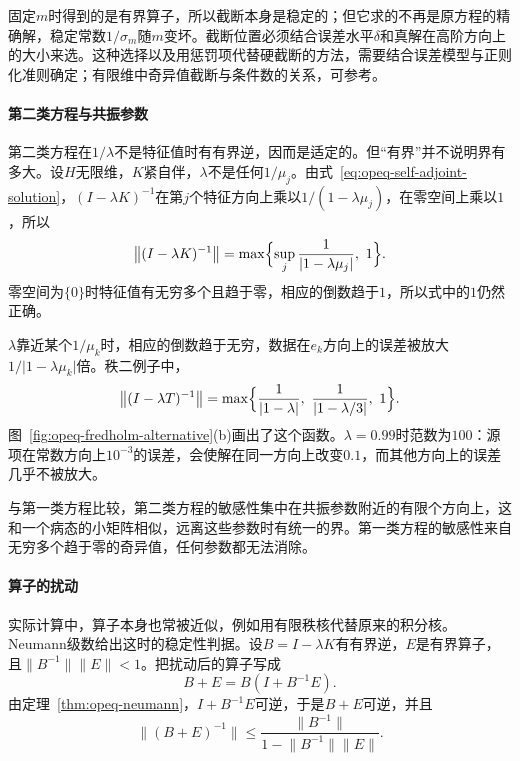 固定$m$时得到的是有界算子，所以截断本身是稳定的；但它求的不再是原方程的精确解，稳定常数$1/\sigma_m$随$m$变坏。截断位置必须结合误差水平$\delta$和真解在高阶方向上的大小来选。这种选择以及用惩罚项代替硬截断的方法，需要结合误差模型与正则化准则确定；有限维中奇异值截断与条件数的关系，可参考。

\paragraph{第二类方程与共振参数}
第二类方程在$1/\lambda$不是特征值时有有界逆，因而是适定的。但“有界”并不说明界有多大。设$H$无限维，$K$紧自伴，$\lambda$不是任何$1/\mu_j$。由式~\eqref{eq:opeq-self-adjoint-solution}，$(I-\lambda K)^{-1}$在第$j$个特征方向上乘以$1/(1-\lambda\mu_j)$，在零空间上乘以$1$，所以
\begin{equation}
  \bigl\lVert(I-\lambda K)^{-1}\bigr\rVert
  =\max\Bigl\{\sup_j\frac{1}{\lvert1-\lambda\mu_j\rvert},\ 1\Bigr\}.
  \label{eq:opeq-resolvent-norm}
\end{equation}
零空间为$\{0\}$时特征值有无穷多个且趋于零，相应的倒数趋于$1$，所以式中的$1$仍然正确。

$\lambda$靠近某个$1/\mu_k$时，相应的倒数趋于无穷，数据在$e_k$方向上的误差被放大$1/\lvert1-\lambda\mu_k\rvert$倍。秩二例子中，
\[
  \bigl\lVert(I-\lambda T)^{-1}\bigr\rVert
  =\max\Bigl\{\frac1{\lvert1-\lambda\rvert},\ \frac1{\lvert1-\lambda/3\rvert},\ 1\Bigr\}.
\]
图~\ref{fig:opeq-fredholm-alternative}(b)画出了这个函数。$\lambda=0.99$时范数为$100$：源项在常数方向上$10^{-3}$的误差，会使解在同一方向上改变$0.1$，而其他方向上的误差几乎不被放大。

与第一类方程比较，第二类方程的敏感性集中在共振参数附近的有限个方向上，这和一个病态的小矩阵相似，远离这些参数时有统一的界。第一类方程的敏感性来自无穷多个趋于零的奇异值，任何参数都无法消除。

\paragraph{算子的扰动}
实际计算中，算子本身也常被近似，例如用有限秩核代替原来的积分核。Neumann级数给出这时的稳定性判据。设$B=I-\lambda K$有有界逆，$E$是有界算子，且$\lVert B^{-1}\rVert\lVert E\rVert<1$。把扰动后的算子写成
\[
  B+E=B(I+B^{-1}E).
\]
由定理~\ref{thm:opeq-neumann}，$I+B^{-1}E$可逆，于是$B+E$可逆，并且
\begin{equation}
  \bigl\lVert(B+E)^{-1}\bigr\rVert
  \leq\frac{\lVert B^{-1}\rVert}{1-\lVert B^{-1}\rVert\lVert E\rVert}.
  \label{eq:opeq-operator-perturbation}
\end{equation}

